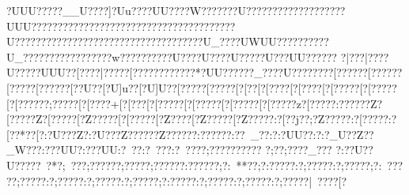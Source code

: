{{{{{{{{{{{{{{{{{{{{{{{{{{{{{{{{{{{{{{{{{{{{{{{{{{{{{{{{{{{{{{{{{{{{{{{{{{{{{{{{{{{{{{{{{{{{{{{{{{{{{{{{{{{{{{{{{{{{{{{{{{{{{{{{{{{{{{{{{{{{{{{{{{{{{{{{{{{{{{{{{{{{{{{{{{{{{{{{{{{{{{{{{{{{{{{{{{{{{{{{{{{{{{{{{{{{{{{{{{{{{{{{{{{{{{{{{{{{{{{{{{{{{{{{{{{{{{{{{{{{{{{{{{{{{{{{{{{{{{{{{{{{{{{{{{{{{{{{{{{{{{{{{{{{{{{{{{{{{{{{{{{{{{{{{{{{{{{{{{{{{{{{{{{{{{{{{{{{{{{{{{{{{{{{{{{{{{{{{{{{{{{{{{{{{{{{{{{{{{{{{{{{{{{{{{{{{{{{{{{{{{{{{{{{{{{{{{{{{{{{{{{{{{{{{{{{{{{{{{{{{{{{{{{{{{{{{{{{{{{{{{{{{{{{{{{{{{{{{{{{{{{{{{{{{{{{{{{{{{{{{{{{{{{{{{{{{{{{{{{{{{{{{{{{{{{{{{{{{{{{{{{{{{{{{{{{{{{{{{{{{{{{{{{{{{{{{{{{{{{{{{{{{{{{{{{{{{{{{{{{{{{{{{{{{{{{{{{{{{{{{{{{{{{{{{{{{{{{{{{{{{{{{{{{{{{{{{{{{{{{{{{{{{{{{{{{{{{{{{{{{{{{{{{{{{{{{{{{{{{{{{{{{{{{{{{{{{{{{{{{{{{{{{{{{{{{{{{{{{{{{{{{{{{{{{{{{{{{{{{{{{{{{{{{{{{{{{{{{{{{{{{{{{{{{{{{{{{{{{{{{{{{{{{{{{{{{{{{{{{{{{{{{{{{{{{{{{{{{{{{{{{{{{{{{{{{{{{{{{{{{{{{{{{{{{{{{{{{{{{{{{{{{{{{{{{{{{{{{{{{{{{{{{{{{{{{{{{{{{{{{{{{{{{{{{{{{{{{{{{{{{{{{{{{{{{{{{{{{{{{{{{{{{{{{{{{{{{{{{{{{{{{{{{{{{{{{{{{{{{{{{{{{{{{{{{{{{{{{{{{{{{{{{{{{{{{{{{{{{{{{{{{{{{{{{{{{{{{{{{{{{{{{{{{{{{{{{{{{{{{{{{{{{{{{{{{{{{{{{{{{{{{{{{{{{{{{{{{{{{{{{{{{{{{{{{{{{{{{{{{{{{{{{{{{{{{{{{{{{{{{{{{{{{{{{{{{{{{{{{{{{{{{{{{{{{{{{{{{{{{{{{{{{{{{{{{{{{{{{{{{{{{{{{{{{{{{{{{{{{{{{{{{{{{{{{{{{{{{{{{{{{{{{{{{{{{{{{{{{{{{{{{{{{{{{{{{{{{{{{{{{{{{{{{{{{{{{{{{{{{{{{{{{{{{{{{{{{{{{{{{{{{{{{{{{{{{{{{{{{{{{{{{{{{{{{{{{{{{{{{{{{{{{{{{{{{{{{{{{{{{{{{{{{{{{{{{{{{{{{{{{{{{{{{{{{{{{{{{{{{{{{{{{{{{{{{{{{{{{{{{{{{{{{{{{{{{{{{{{{{{{{{{{{{{{{{{{{{{{{{{{{{{{{{{{{{{{{{{{{{{{{{{{{{{{{{{{{{{{{{{{{{{{{{{{{{{{{{{{{{{{{{{{{{{{{{{{{{{{{{{{{{{{{{{{{{{{{{{{{{{{{{{{{{{{{{{{{{{{{{{{{{{{{{{{{{{{{{{{{{{{{{{{{{{{{{{{{{{{{{{{{{{{{{{{{{{{{{{{{{{{{{{{{{{{{{{{{{{{{{{{{{{{{{{{{{{{{{{{{{{{{{{{{{{{{{{{{{{{{{{{{{{{{{{{{{{{{{{{{{{{{{{{{{{{{{{{{{{{{{{{{{{{{{{{{{{{{{{{{{{{{{{{{{{{{{{{{{{{{{{{{{{{{{{{{{{{{{{{{{{{{{{{{{{{{{{{{{{{{{{{{{{{{{{{{{{{{{{{{{{{{{{{{{{{{{{{{{{{{{{{{{{{{{{{{{{{{{{{{{{{{{{{{{{{{{{{{{{{{{{{{{{{{{{{{{{{{{{{{{{{{{{{{{{{{{{{{{{{{{{{{{{{{{{{{{{{{{{{{{{{{{{{{{{{{{{{{{{{{{{{{{{{{{{{{{{{{{{{{{{{{{{{{{{{{{{{{{{{{{{{{{{{{{{{{{{{{{{{{{{{{{{{{{{{{{{{{{{{{{{{{{{{{{{{{{{{{{{{{{{{{{{{{{{{{{{{{{{{{{{{{{{{{{{{{{{{{{{{{{{{{{{{{{{{{{{{{{{{{{{{{{{{{{{{{{{{{{{{{{{{{{{{{{{{{{{{{{{{{{{{{{{{{{{{{{{{{{{{{{{{{{{{{{{{{{{{{{{{{{{{{{{{{{{{{{{{{{{{{{{{{{{{{{{{{{{{{{{{{{{{{{{{{{{{{{{{{{{{{{{{{{{{{{{{{{{?UUU?????__U}????]?Uu????U}U????W???????U?????{???????{???{????UUU??{???  ??{???  ??{???  ??{???????{?????????  ??????U???????  ????{?????{???????{?????????????U_????UWUU{???????{???U_????{???????{???  ??{?w?  ??{???  ????U?  ??{?U? ?{?{?U???{?{?U?{?{?UU??{????   {?|???  |?{???}U{?{??   {?{?UUU?{?[???  {?|???? {?[?????{?{?  {?{??   {?{?*?UU{?{??? {?{?_?? {?{?U?? {?{???? {?[?????{?[?????{?[????{?[?????{?[??U?{?[?U]u?{?[?U]U?{?[?????[?{???? [?[??  [?[???? [?[???? [?[?????[?[?????[?[?????{?;?????[?[????+[?[???[?[?????[?[?????[?[?????[?[?????z?[?????:?{?????Z?[?????Z?[?????[?Z?????[?[?????[?Z????[?Z?????[?Z?????:?[??j??;?Z?????:?[?????:?[??*??[?:?U???Z?:?U???Z??????Z??????:??????:??~_??:?:?UU??:?:?_U??Z??_W???:???UU?:???UU:?~??  :?~??? :?~????;??????????
?;??  ;????_???
?:??U??U?????~?*?;~??  ?;??????;?????;??????:??????;?:~**??;?:?????:?;?????:?;?????;?:~?????;?????:?;?????:?;?????:?;?????;?:?????:?;?????:?;?????:?;???? ?|~??? ?[?}}}}}}}}}}}}}}}}}}}}}}}}}}}}}}}}}}}}}}}}}}}}}}}}}}}}}}}}}}}}}}}}}}}}}}}}}}}}}}}}}}}}}}}}}}}}}}}}}}}}}}}}}}}}}}}}}}}}}}}}}}}}}}}}}}}}}}}}}}}}}}}}}}}}}}}}}}}}}}}}}}}}}}}}}}}}}}}}}}}}}}}}}}}}}}}}}}}}}}}}}}}}}}}}}}}}}}}}}}}}}}}}}}}}}}}}}}}}}}}}}}}}}}}}}}}}}}}}}}}}}}}}}}}}}}}}}}}}}}}}}}}}}}}}}}}}}}}}}}}}}}}}}}}}}}}}}}}}}}}}}}}}}}}}}}}}}}}}}}}}}}}}}}}}}}}}}}}}}}}}}}}}}}}}}}}}}}}}}}}}}}}}}}}}}}}}}}}}}}}}}}}}}}}}}}}}}}}}}}}}}}}}}}}}}}}}}}}}}}}}}}}}}}}}}}}}}}}}}}}}}}}}}}}}}}}}}}}}}}}}}}}}}}}}}}}}}}}}}}}}}}}}}}}}}}}}}}}}}}}}}}}}}}}}}}}}}}}}}}}}}}}}}}}}}}}}}}}}}}}}}}}}}}}}}}}}}}}}}}}}}}}}}}}}}}}}}}}}}}}}}}}}}}}}}}}}}}}}}}}}}}}}}}}}}}}}}}}}}}}}}}}}}}}}}}}}}}}}}}}}}}}}}}}}}}}}}}}}}}}}}}}}}}}}}}}}}}}}}}}}}}}}}}}}}}}}}}}}}}}}}}}}}}}}}}}}}}}}}}}}}}}}}}}}}}}}}}}}}}}}}}}}}}}}}}}}}}}}}}}}}}}}}}}}}}}}}}}}}}}}}}}}}}}}}}}}}}}}}}}}}}}}}}}}}}}}}}}}}}}}}}}}}}}}}}}}}}}}}}}}}}}}}}}}}}}}}}}}}}}}}}}}}}}}}}}}}}}}}}}}}}}}}}}}}}}}}}}}}}}}}}}}}}}}}}}}}}}}}}}}}}}}}}}}}}}}}}}}}}}}}}}}}}}}}}}}}}}}}}}}}}}}}}}}}}}}}}}}}}}}}}}}}}}}}}}}}}}}}}}}}}}}}}}}}}}}}}}}}}}}}}}}}}}}}}}}}}}}}}}}}}}}}}}}}}}}}}}}}}}}}}}}}}}}}}}}}}}}}}}}}}}}}}}}}}}}}}}}}}}}}}}}}}}}}}}}}}}}}}}}}}}}}}}}}}}}}}}}}}}}}}}}}}}}}}}}}}}}}}}}}}}}}}}}}}}}}}}}}}}}}}}}}}}}}}}}}}}}}}}}}}}}}}}}}}}}}}}}}}}}}}}}}}}}}}}}}}}}}}}}}}}}}}}}}}}}}}}}}}}}}}}}}}}}}}}}}}}}}}}}}}}}}}}}}}}}}}}}}}}}}}}}}}}}}}}}}}}}}}}}}}}}}}}}}}}}}}}}}}}}}}}}}}}}}}}}}}}}}}}}}}}}}}}}}}}}}}}}}}}}}}}}}}}}}}}}}}}}}}}}}}}}}}}}}}}}}}}}}}}}}}}}}}}}}}}}}}}}}}}}}}}}}}}}}}}}}}}}}}}}}}}}}}}}}}}}}}}}}}}}}}}}}}}}}}}}}}}}}}}}}}}}}}}}}}}}}}}}}}}}}}}}}}}}}}}}}}}}}}}}}}}}}}}}}}}}}}}}}}}}}}}}}}}}}}}}}}}}}}}}}}}}}}}}}}}}}}}}}}}}}}}}}}}}}}}}}}}}}}}}}}}}}}}}}}}}}}}}}}}}}}}}}}}}}}}}}}}}}}}}}}}}}}}}}}}}}}}}}}}}}}}}}}}}}}}}}}}}}}}}}}}}}}}}}}}}}}}}}}}}}}}}}}}}}}}}}}}}}}}}}}}}}}}}}}}}}}}}}}}}}}}}}}}}}}}}}}}}}}}}}}}}}}}}}}}}}}}}}}}}}}}}}}}}}}}}}}}}}}}}}}}}}}}}}}}}}}}}}}}}}}}}}}}}}}}}}}}}}}}}}}}}}}}}}}}}}}}}}}}}}}}}}}}}}}}}}}}}}}}}}}}}}}}}}}}}}}}}}}}}}}}}}}}}}}}}}}}}}}}}}}}}}}}}}}}}}}}}}}}}}}}}}}}}}}}}}}}}}}}}}}}}}}}}}}}}}}}}}}}}}}}}}}}}}}}}}}}}}}}}}}}}}}}}}}}}}}}}}}}}}}}}}}}}}}}}}}}}}}}}}}}}}}}}}}}}}}}}}}}}}}}}}}}}}}}}}}}}}}}}}}}}}}}}}}}}}}}}}}}}}}}}}}}}}}}}}}}}}}}}}}}}}}}}}}}}}}}}}}}}}}}}}}}}}}}}}}}}}}}}}}}}}}}}}}}}}}}}}}}}}}}}}}}}}}}}}}}}}}}}}}}}}}}}}}}}}}}}}}}}}}}}}}}}}}}}}}}}}}}}}}}}}}}}}}}}}}}}}}}}}}}}}}}}}}}}}}}}}}}}}}}}}}}}}}}}}}}}}}}}}}}}}}}}}}}}}}}}}}}}}}}}}}}}}}}}}}}}}}}}}}}}}}}}}}}}}}}}}}}}}}}}}}}}}
